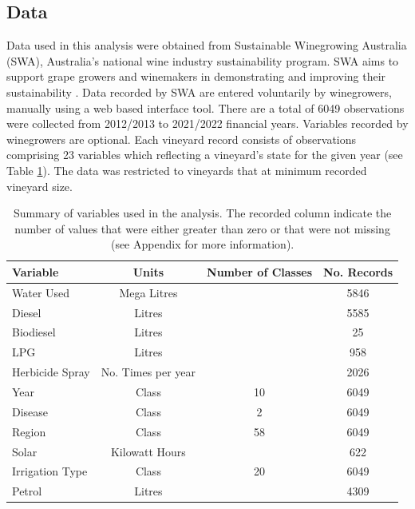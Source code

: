 \documentclass[review,12pt,authoryear]{elsarticle}
\begin{document}
\begin{linenumbers}
\subsection{Data}\label{Data}
% 
Data used in this analysis were obtained from Sustainable Winegrowing Australia (SWA), Australia's national wine industry sustainability program. SWA aims to support grape growers and winemakers in demonstrating and improving their sustainability \citep{swaSustainableWingrowingAustralia2022}. Data recorded by SWA are entered voluntarily by winegrowers, manually using a web based interface tool. There are a total of 6049 observations were collected from 2012/2013 to 2021/2022 financial years. Variables recorded by winegrowers are optional. Each vineyard record consists of observations comprising 23 variables which reflecting a vineyard's state for the given year (see Table \ref{tab:vars}). The data was restricted to vineyards that at minimum recorded vineyard size.
\par
\begin{table}[] 
\caption{Summary of variables used in the analysis. The recorded column indicate the number of values that were either greater than zero or that were not missing (see Appendix for more information).} \label{tab:vars}
 \small
  \begin{tabular}{@{}lccc@{}}
  \toprule
  \textbf{Variable} & \textbf{Units} & \textbf{Number of Classes} & \textbf{No. Records} \\ \midrule
  Water Used & Mega Litres &  & 5846 \\
  Diesel & Litres &  & 5585 \\
  Biodiesel & Litres &  & 25 \\
  LPG & Litres &  & 958 \\
  Herbicide Spray & No. Times per year &  & 2026 \\
  Year & Class & 10 & 6049 \\
  Disease & Class & 2 & 6049 \\
  Region & Class & 58 & 6049 \\
  Solar & Kilowatt Hours &  & 622 \\
  Irrigation Type & Class & 20 & 6049 \\
  Petrol & Litres &  & 4309 \\

\end{tabular}
\end{table}
\end{linenumbers}
\end{document}
